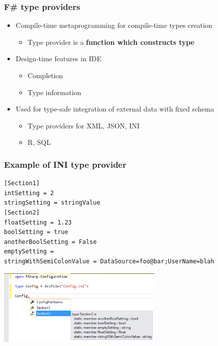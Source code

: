 \documentclass[xcolor=table]{beamer}
\begin{document}
\begin{frame}
  \transwipe[direction=90]
  \frametitle{F\# type providers}
\begin{itemize}
 \item Compile-time metaprogramming for compile-time types creation
 \begin{itemize}
  \item Type provider is a \textbf{function which constructs type}
 \end{itemize}
 \item Design-time features in IDE
 \begin{itemize}
   \item Completion
   \item Type information
 \end{itemize}
 \item Used for type-safe integration of external data with fixed schema
 \begin{itemize}
   \item Type providers for XML, JSON, INI
   \item R, SQL
 \end{itemize}
\end{itemize}

\end{frame}


\begin{frame}[fragile]
  \transwipe[direction=90]
  \frametitle{Example of INI type provider}

\small{
\begin{verbatim}
[Section1]
intSetting = 2
stringSetting = stringValue
[Section2]
floatSetting = 1.23
boolSetting = true
anotherBoolSetting = False
emptySetting =
stringWithSemiColonValue = DataSource=foo@bar;UserName=blah 
\end{verbatim}
}
\includegraphics[width=0.6\textwidth]{pictures/INIExample.png}

\end{frame}
\end{document}
